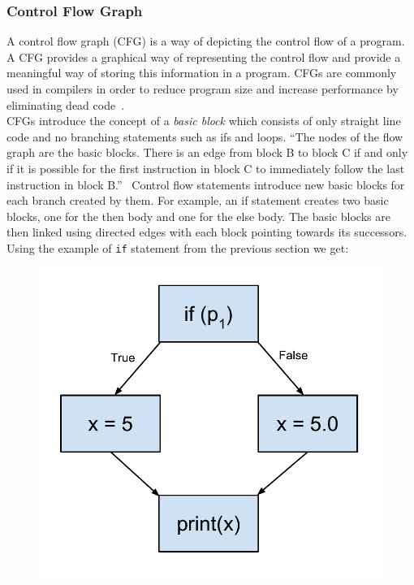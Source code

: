 \documentclass[12pt, titlepage]{article}
\begin{document}
\subsubsection{Control Flow Graph}
\label{chap:cfgs}
A control flow graph (CFG) is a way of depicting the control flow of a program. A CFG provides a graphical way of representing the control flow and provide a meaningful way of storing this information in a program. CFGs are commonly used in compilers in order to reduce program size and increase performance by eliminating dead code~\cite{dragonBook}. \\
\indent CFGs introduce the concept of a \textit{basic block} which consists of only straight line code and no branching statements such as ifs and loops. ``The nodes of the flow 
graph are the basic blocks. There is an edge from block B to block C if and 
only if it is possible for the first instruction in block C to immediately follow 
the last instruction in block B.''~\cite{dragonBook} Control flow statements introduce new basic blocks for each branch created by them. For example, an if statement creates two basic blocks, one for the then body and one for the else body. The basic blocks are then linked using directed edges with each block pointing towards its successors. \\
\indent Using the example of \texttt{if} statement from the previous section we get:
\begin{figure}[h]
\centering
\includegraphics[scale=0.4]{images/controlFlowGraph.pdf}
\end{figure}  \\
\end{document}
